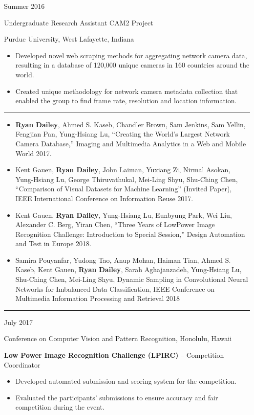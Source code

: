 \documentclass[10pt]{article}
\newlength{\cvcolumngapwidth}
\newlength{\cvleftcolumnwidth}
\newlength{\cvrightcolumnwidth}
\newcommand{\cvsectionstyle}[1]{{\normalsize\cvsectionfont\textcolor{cvsectioncolor}{#1}}}
\newcommand{\cvtitlestyle}[1]{{\large\cvtitlefont\textcolor{cvtitlecolor}{#1}}}
\newcommand{\cvdurationstyle}[1]{{\small\cvdurationfont\textcolor{cvdurationcolor}{#1}}}
\newlength{\cvafteritemskipamount}
\newlength{\cvaftersectionskipamount}
\newlength{\cvparskip}
\newcommand{\cvsection}[1]{
    \begin{minipage}[t]{\cvleftcolumnwidth}
        \raggedleft\cvsectionstyle{#1}
    \end{minipage}%
    \hspace{\cvcolumngapwidth}%
    \begin{minipage}[t]{\cvrightcolumnwidth}
        \textcolor{cvrulecolor}{\rule{\cvrightcolumnwidth}{0.3mm}}
    \end{minipage}

    \vspace{\cvaftersectionskipamount}
}
\newcommand{\cvitem}[2]{
    \begin{minipage}[t]{\cvleftcolumnwidth}
        \raggedleft #1
    \end{minipage}%
    \hspace{\cvcolumngapwidth}%
    \begin{minipage}[t]{\cvrightcolumnwidth}
        \setlength{\parskip}{\cvparskip} #2
    \end{minipage}

    \vspace{\cvafteritemskipamount}
}
\newcommand{\cvtitle}[1]{
    \cvtitlestyle{#1}

    \vspace{1mm plus 0.25mm minus 0.25mm}
    \vspace{-\cvparskip}
}
\begin{document}
\cvitem{
    \cvdurationstyle{Summer 2016}
}{
    \cvtitle{Undergraduate Research Assistant CAM2 Project}

    Purdue University, West Lafayette, Indiana

    \begin{itemize}[leftmargin=*]
        \item Developed novel web scraping methods for aggregating network camera data, resulting in a database of 120,000 unique cameras in 160 countries around the world.
        \item Created unique methodology for network camera metadata collection that enabled the group to find frame rate, resolution and location information.
    \end{itemize}
}

\cvsection{PUBLICATIONS}

\cvitem{
    \cvdurationstyle{}
}{

    \begin{itemize}[leftmargin=*]
        \item \textbf{Ryan Dailey}, Ahmed S. Kaseb, Chandler Brown, Sam Jenkins, Sam Yellin, Fengjian Pan, Yung-Hsiang Lu, “Creating the World’s Largest Network Camera Database,” Imaging and Multimedia Analytics in a Web and Mobile World 2017.
        \item Kent Gauen, \textbf{Ryan Dailey}, John Laiman, Yuxiang Zi, Nirmal Asokan, Yung-Hsiang Lu, George Thiruvathukal, Mei-Ling Shyu, Shu-Ching Chen, “Comparison of Visual Datasets for Machine Learning” (Invited Paper), IEEE International Conference on Information Reuse 2017.
        \item Kent Gauen, \textbf{Ryan Dailey}, Yung-Hsiang Lu, Eunbyung Park, Wei Liu, Alexander C. Berg, Yiran Chen, “Three Years of LowPower Image Recognition Challenge: Introduction to Special Session,” Design Automation and Test in Europe 2018.
        \item Samira Pouyanfar, Yudong Tao, Anup Mohan, Haiman Tian, Ahmed S. Kaseb, Kent Gauen, \textbf{Ryan Dailey}, Sarah Aghajanzadeh, Yung-Hsiang Lu, Shu-Ching Chen, Mei-Ling Shyu, Dynamic Sampling in Convolutional Neural Networks for Imbalanced Data Classification, IEEE Conference on Multimedia Information Processing and Retrieval 2018
    \end{itemize}
}

\cvsection{EXPERIENCE AND PRESENTATIONS}

\cvitem{
    \cvdurationstyle{July 2017}
}{
    \cvtitle{Conference on Computer Vision and Pattern Recognition, Honolulu, Hawaii}
    
    \textbf{Low Power Image Recognition Challenge (LPIRC)} – Competition Coordinator

    \begin{itemize}[leftmargin=*]
        \item Developed automated submission and scoring system for the competition. 
        \item Evaluated the participants' submissions to ensure accuracy and fair competition during the event.
    \end{itemize}
}
\end{document}
